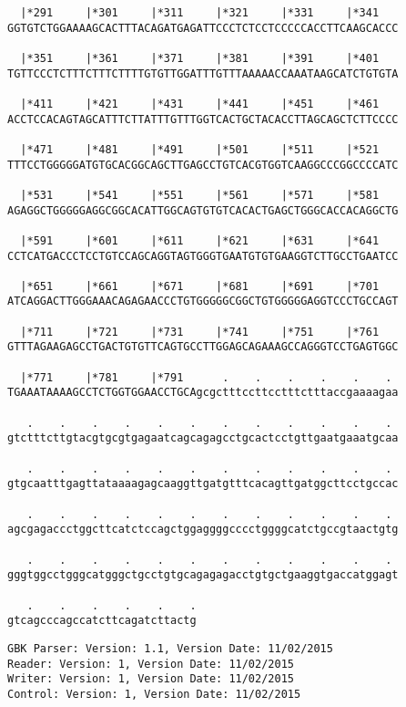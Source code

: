\documentclass{article}
\begin{document}
\begin{Verbatim}
  |*291     |*301     |*311     |*321     |*331     |*341   
GGTGTCTGGAAAAGCACTTTACAGATGAGATTCCCTCTCCTCCCCCACCTTCAAGCACCC
  
  |*351     |*361     |*371     |*381     |*391     |*401   
TGTTCCCTCTTTCTTTCTTTTGTGTTGGATTTGTTTAAAAACCAAATAAGCATCTGTGTA
  
  |*411     |*421     |*431     |*441     |*451     |*461   
ACCTCCACAGTAGCATTTCTTATTTGTTTGGTCACTGCTACACCTTAGCAGCTCTTCCCC
  
  |*471     |*481     |*491     |*501     |*511     |*521   
TTTCCTGGGGGATGTGCACGGCAGCTTGAGCCTGTCACGTGGTCAAGGCCCGGCCCCATC
  
  |*531     |*541     |*551     |*561     |*571     |*581   
AGAGGCTGGGGGAGGCGGCACATTGGCAGTGTGTCACACTGAGCTGGGCACCACAGGCTG
  
  |*591     |*601     |*611     |*621     |*631     |*641   
CCTCATGACCCTCCTGTCCAGCAGGTAGTGGGTGAATGTGTGAAGGTCTTGCCTGAATCC
  
  |*651     |*661     |*671     |*681     |*691     |*701   
ATCAGGACTTGGGAAACAGAGAACCCTGTGGGGGCGGCTGTGGGGGAGGTCCCTGCCAGT
  
  |*711     |*721     |*731     |*741     |*751     |*761   
GTTTAGAAGAGCCTGACTGTGTTCAGTGCCTTGGAGCAGAAAGCCAGGGTCCTGAGTGGC
  
  |*771     |*781     |*791      .    .    .    .    .    . 
TGAAATAAAAGCCTCTGGTGGAACCTGCAgcgctttccttcctttctttaccgaaaagaa
  
   .    .    .    .    .    .    .    .    .    .    .    . 
gtctttcttgtacgtgcgtgagaatcagcagagcctgcactcctgttgaatgaaatgcaa
  
   .    .    .    .    .    .    .    .    .    .    .    . 
gtgcaatttgagttataaaagagcaaggttgatgtttcacagttgatggcttcctgccac
  
   .    .    .    .    .    .    .    .    .    .    .    . 
agcgagaccctggcttcatctccagctggaggggcccctggggcatctgccgtaactgtg
  
   .    .    .    .    .    .    .    .    .    .    .    . 
gggtggcctgggcatgggctgcctgtgcagagagacctgtgctgaaggtgaccatggagt
  
   .    .    .    .    .    .
gtcagcccagccatcttcagatcttactg
\end{Verbatim}
\newpage
\begin{Verbatim}
GBK Parser: Version: 1.1, Version Date: 11/02/2015
Reader: Version: 1, Version Date: 11/02/2015
Writer: Version: 1, Version Date: 11/02/2015
Control: Version: 1, Version Date: 11/02/2015
\end{Verbatim}
\end{document}
